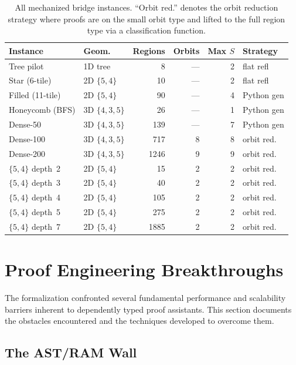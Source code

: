 \documentclass[11pt, a4paper]{article}
\theoremstyle{plain}
\theoremstyle{definition}
\begin{document}
\begin{table}[ht]
\centering
\small
\begin{tabular}{@{}llrrrl@{}}
\toprule
\textbf{Instance} & \textbf{Geom.} & \textbf{Regions} &
\textbf{Orbits} & \textbf{Max $S$} & \textbf{Strategy} \\
\midrule
Tree pilot       & 1D tree   &    8 & --- &  2 & flat refl \\
Star (6-tile)    & 2D $\{5,4\}$ &  10 & --- &  2 & flat refl \\
Filled (11-tile) & 2D $\{5,4\}$ &  90 & --- &  4 & Python gen \\
Honeycomb (BFS)  & 3D $\{4,3,5\}$ & 26 & --- &  1 & Python gen \\
Dense-50         & 3D $\{4,3,5\}$ & 139 & --- & 7 & Python gen \\
Dense-100        & 3D $\{4,3,5\}$ & 717 &  8 &  8 & orbit red. \\
Dense-200        & 3D $\{4,3,5\}$ & 1246 & 9 &  9 & orbit red. \\
$\{5,4\}$ depth~2 & 2D $\{5,4\}$ & 15 & 2 &  2 & orbit red. \\
$\{5,4\}$ depth~3 & 2D $\{5,4\}$ & 40 & 2 &  2 & orbit red. \\
$\{5,4\}$ depth~4 & 2D $\{5,4\}$ & 105 & 2 & 2 & orbit red. \\
$\{5,4\}$ depth~5 & 2D $\{5,4\}$ & 275 & 2 & 2 & orbit red. \\
$\{5,4\}$ depth~7 & 2D $\{5,4\}$ & 1885 & 2 & 2 & orbit red. \\
\bottomrule
\end{tabular}
\caption{All mechanized bridge instances.  ``Orbit red.''
  denotes the orbit reduction strategy where proofs are on the
  small orbit type and lifted to the full region type via a
  classification function.}
\label{tab:instances}
\end{table}

\section{Proof Engineering Breakthroughs}
\label{sec:engineering}

The formalization confronted several fundamental performance and
scalability barriers inherent to dependently typed proof assistants.
This section documents the obstacles encountered and the techniques
developed to overcome them.

\subsection{The AST/RAM Wall}
\label{sec:ram}
\end{document}
